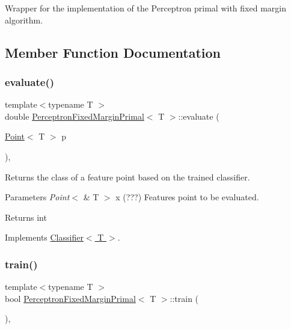 Wrapper for the implementation of the Perceptron primal with fixed margin algorithm. 

\subsection{Member Function Documentation}
\mbox{\label{class_perceptron_fixed_margin_primal_a5bfe0f03533361017b594c3fe67f0905}} 
\subsubsection{\texorpdfstring{evaluate()}{evaluate()}}
{\footnotesize\ttfamily template$<$typename T $>$ \\
double \hyperlink{class_perceptron_fixed_margin_primal}{Perceptron\+Fixed\+Margin\+Primal}$<$ T $>$\+::evaluate (\begin{DoxyParamCaption}\item[{\hyperlink{class_point}{Point}$<$ T $>$}]{p }\end{DoxyParamCaption})\hspace{0.3cm}{\ttfamily [override]}, {\ttfamily [virtual]}}



Returns the class of a feature point based on the trained classifier. 


\begin{DoxyParams}{Parameters}
{\em Point$<$} & T $>$ x (???) Features point to be evaluated. \\
\hline
\end{DoxyParams}
\begin{DoxyReturn}{Returns}
int 
\end{DoxyReturn}


Implements \hyperlink{class_classifier_ab3b9544a8d9c3cbde8d5865c7e9be0fb}{Classifier$<$ T $>$}.

\mbox{\label{class_perceptron_fixed_margin_primal_a6d4a14b9f39a4fef45de201edfeabce0}} 
\subsubsection{\texorpdfstring{train()}{train()}}
{\footnotesize\ttfamily template$<$typename T $>$ \\
bool \hyperlink{class_perceptron_fixed_margin_primal}{Perceptron\+Fixed\+Margin\+Primal}$<$ T $>$\+::train (\begin{DoxyParamCaption}{ }\end{DoxyParamCaption})\hspace{0.3cm}{\ttfamily [override]}, {\ttfamily [virtual]}}



